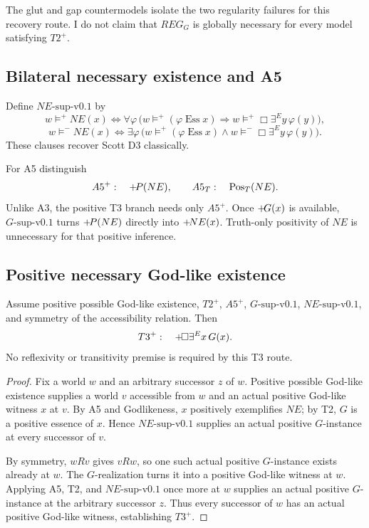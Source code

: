 The glut and gap countermodels isolate the two regularity failures for this recovery route. I do not claim that \(REG_G\) is globally necessary for every model satisfying \(T2^+\).

\subsection{Bilateral necessary existence and A5}

Define \(NE\text{-sup-v0.1}\) by
\[
  w\models^+NE(x)
  \Longleftrightarrow
  \forall\varphi\,
  \bigl(
  w\models^+(\varphi\operatorname{Ess}x)
  \Rightarrow
  w\models^+\Box\exists^E y\,\varphi(y)
  \bigr),
\]
\[
  w\models^-NE(x)
  \Longleftrightarrow
  \exists\varphi\,
  \bigl(
  w\models^+(\varphi\operatorname{Ess}x)
  \land
  w\models^-\Box\exists^E y\,\varphi(y)
  \bigr).
\]
These clauses recover Scott D3 classically.

For A5 distinguish
\[
  A5^+:\quad +\!P(NE),
  \qquad
  A5_T:\quad \operatorname{Pos}_{T}(NE).
\]
Unlike A3, the positive T3 branch needs only \(A5^+\). Once \(+\!G(x)\) is available, \(G\text{-sup-v0.1}\) turns \(+\!P(NE)\) directly into \(+\!NE(x)\). Truth-only positivity of \(NE\) is unnecessary for that positive inference.

\subsection{Positive necessary God-like existence}

\begin{theorem}
Assume positive possible God-like existence, \(T2^+\), \(A5^+\), \(G\text{-sup-v0.1}\), \(NE\text{-sup-v0.1}\), and symmetry of the accessibility relation. Then
\[
  T3^+:\quad
  +\!\Box\exists^E x\,G(x).
\]
No reflexivity or transitivity premise is required by this T3 route.
\end{theorem}
\begin{proof}
Fix a world \(w\) and an arbitrary successor \(z\) of \(w\). Positive possible God-like existence supplies a world \(v\) accessible from \(w\) and an actual positive God-like witness \(x\) at \(v\). By A5 and Godlikeness, \(x\) positively exemplifies \(NE\); by T2, \(G\) is a positive essence of \(x\). Hence \(NE\text{-sup-v0.1}\) supplies an actual positive \(G\)-instance at every successor of \(v\).

By symmetry, \(wRv\) gives \(vRw\), so one such actual positive \(G\)-instance exists already at \(w\). The \(G\)-realization turns it into a positive God-like witness at \(w\). Applying A5, T2, and \(NE\text{-sup-v0.1}\) once more at \(w\) supplies an actual positive \(G\)-instance at the arbitrary successor \(z\). Thus every successor of \(w\) has an actual positive God-like witness, establishing \(T3^+\).
\end{proof}

